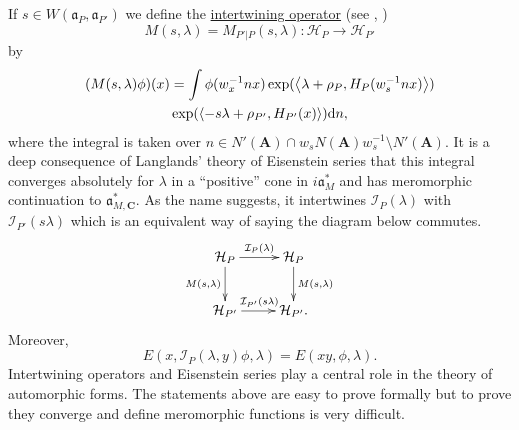 \documentclass{ims9x6}
\def\A{\mathbf A}
\def\C{\mathbf C}
\def\HHH{\mathcal H}
\def\III{\mathcal I}
\def\aaa{\mathfrak a}
\def\d{\text d}
\def\bs{\setminus}
\def\sprod#1#2{\left\langle #1 , #2 \right\rangle}  %
\begin{document}
If $s \in W(\aaa_P, \aaa_{P'})$ we define the \underline{intertwining operator} (see \cite[\S 6]{MR2683009}, \cite[II.1.6]{MW})
\[ M(s, \lambda) = M_{P'|P}(s, \lambda) : \HHH_P \to \HHH_{P'} \]
by
\begin{multline*}
	(M(s, \lambda)\phi)(x) = \int \phi(w_x^{-1}n x) \exp(\sprod{\lambda + \rho_P}{H_P(w_s^{-1}n x)}) \\ \exp(\sprod{- s\lambda + \rho_{P'}}{H_{P'}(x)}) \d n,
\end{multline*}
where the integral is taken over $n \in N'(\A) \cap w_s N(\A)w_s^{-1} \bs N'(\A)$. It is a deep consequence of Langlands' theory of Eisenstein series that this integral converges absolutely for $\lambda$ in a ``positive'' cone in $i\aaa_M^*$ and has meromorphic continuation to $\aaa_{M, \C}^*$. As the name suggests, it intertwines $\III_P(\lambda)$ with $\III_{P'}(s\lambda)$ which is an equivalent way of saying the diagram below commutes. 
\[ \xymatrix{
	\HHH_P \ar[r]^{\III_P(\lambda)} \ar[d]_{M(s, \lambda)} & \HHH_P \ar[d]^{M(s, \lambda)} \\
	\HHH_{P'} \ar[r]^{\III_{P'}(s\lambda)} & \HHH_{P'}.
 } \]
Moreover,
\[ E(x, \III_P(\lambda, y)\phi, \lambda) = E(xy, \phi, \lambda). \]
Intertwining operators and Eisenstein series play a central role in the theory of automorphic forms. The statements above are easy to prove formally but to prove they converge and define meromorphic functions is very difficult.
\end{document}
